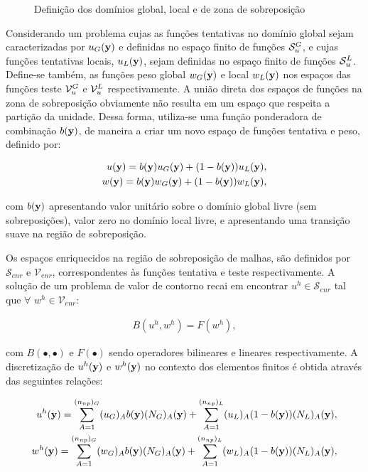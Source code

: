 \documentclass[tese_patricia]{subfiles}
\begin{document}
\begin{figure}[!htb]
	\caption{Definição dos domínios global, local e de zona de sobreposição }
	\label{fig:domains}
\end{figure}

Considerando um problema cujas as funções tentativas no domínio global sejam caracterizadas por $u_{G}(\mathbf{y})$ e definidas no espaço finito de funções $\mathcal{S}_u^{G}$, e cujas funções tentativas locais, $u_{L}(\mathbf{y})$, sejam definidas no espaço finito de funções $\mathcal{S}_u^{L}$. Define-se também, as funções peso global $w_{G}(\mathbf{y})$ e local $w_{L}(\mathbf{y})$ nos espaços das funções teste $\mathcal{V}_u^{G}$ e $\mathcal{V}_u^{L}$ respectivamente. A união direta dos espaços de funções na zona de sobreposição obviamente não resulta em um espaço que respeita a partição da unidade. 
Dessa forma, utiliza-se uma função ponderadora de combinação $b(\mathbf{y})$, de maneira a criar um novo espaço de funções tentativa e peso, definido por:

\begin{align}
u(\mathbf{y}) = b(\mathbf{y})u_{G}(\mathbf{y}) + (1-b(\mathbf{y}))u_{L}(\mathbf{y}),\\
w(\mathbf{y}) = b(\mathbf{y})w_{G}(\mathbf{y}) + (1-b(\mathbf{y}))w_{L}(\mathbf{y}),
\end{align}

\noindent com $b(\mathbf{y})$ apresentando valor unitário sobre o domínio global livre (sem sobreposições), valor zero no domínio local livre, e apresentando uma transição suave na região de sobreposição. 

Os espaços enriquecidos na região de sobreposição de malhas, são definidos por $\mathcal{S}_{enr}$ e $\mathcal{V}_{enr}$, correspondentes às funções tentativa e teste respectivamente. A solução de um problema de valor de contorno recai em encontrar $u^{h} \in \mathcal{S}_{enr}$ tal que $\forall$ $ w^{h} \in \mathcal{V}_{enr}$: 

\begin{align}
B(u^{h},w^{h}) = F(w^{h}),
\end{align}

\noindent com $B(\bullet,\bullet)$ e $F(\bullet)$ sendo operadores bilineares e lineares respectivamente. A discretização de $u^{h}(\mathbf{y})$ e $w^{h}(\mathbf{y})$ no contexto dos elementos finitos é obtida através das seguintes relações:

\begin{align}
u^{h}(\mathbf{y}) = \sum_{A = 1}^{(n_{np})_G} (u_{G})_{A}b(\mathbf{y})(N_{G})_{A}(\mathbf{y}) + \sum_{A = 1}^{(n_{np})_L} (u_{L})_{A}(1-b(\mathbf{y}))(N_{L})_{A}(\mathbf{y}),\\
w^{h}(\mathbf{y}) = \sum_{A = 1}^{(n_{np})_G} (w_{G})_{A}b(\mathbf{y})(N_{G})_{A}(\mathbf{y}) + \sum_{A = 1}^{(n_{np})_L} (w_{L})_{A}(1-b(\mathbf{y}))(N_{L})_{A}(\mathbf{y}),
\end{align}
\end{document}
